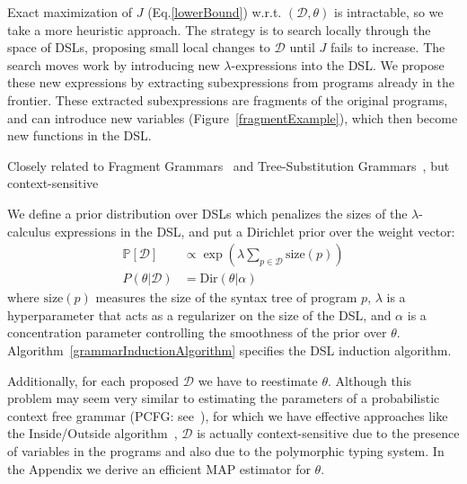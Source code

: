\documentclass{article}
\newcommand{\probability}{\mathds{P}} %
\begin{document}
Exact maximization of $J$ (Eq.\ref{lowerBound}) w.r.t. $(\mathcal{D},\theta)$
is intractable,
so we take a more heuristic approach.
The strategy is to search locally through the space of DSLs,
proposing small local changes to $\mathcal{D}$ until $J$ fails to increase.
The search moves work by introducing new
$\lambda$-expressions into the DSL.
We propose these new expressions by extracting subexpressions from
programs already in the frontier.
These extracted subexpressions
are fragments of the original programs, and can introduce new variables (Figure~\ref{fragmentExample}),
which then become new functions in the DSL.

Closely related to Fragment Grammars~\cite{tim} and Tree-Substitution Grammars~\cite{cohn2010inducing},
but context-sensitive

We define a prior distribution over DSLs which penalizes the sizes of the $\lambda$-calculus expressions in the DSL, and put a Dirichlet prior over the weight vector:
\begin{align*}
  \probability[\mathcal{D}]&\propto\exp\left(\lambda\sum_{p\in \mathcal{D}}\text{size}(p) \right)\\
  P(\theta|\mathcal{D})& = \text{Dir}(\theta|\alpha)
\end{align*}
where $\text{size}(p)$  measures the size of the syntax tree of program $p$,
$\lambda$ is a hyperparameter that acts as a regularizer on the size of the DSL,
and $\alpha$ is a concentration parameter controlling the smoothness of the prior over $\theta$.
Algorithm~\ref{grammarInductionAlgorithm} specifies the DSL induction algorithm.

Additionally, for each proposed $\mathcal{D}$ we have to reestimate $\theta$.
Although this problem may seem 
very similar to estimating the parameters of a probabilistic context free grammar (PCFG: see~\cite{}),
for which we have effective approaches like the Inside/Outside algorithm~\cite{international2000derivation},
$\mathcal{D}$
 is actually context-sensitive
due to the presence of variables in the programs and also due to the
polymorphic typing system.
In the Appendix we derive an efficient MAP estimator for $\theta$.
\end{document}
